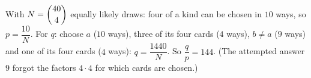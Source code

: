 With $N=\dbinom{40}4$ equally likely draws: four of a kind can be chosen in $10$ ways, so $p=\dfrac{10}{N}$. For $q$: choose $a$ ($10$ ways), three of its four cards ($4$ ways), $b\ne a$ ($9$ ways) and one of its four cards ($4$ ways): $q=\dfrac{1440}{N}$. So $\dfrac {q}{p}=\boxed{144}$. (The attempted answer $9$ forgot the factors $4\cdot4$ for which cards are chosen.)
